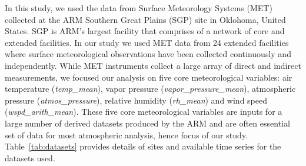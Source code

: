 In this study, we used the data from Surface Meteorology Systems (MET)
collected at the ARM Southern Great Plains (SGP) site in
Oklohoma, United States. SGP is ARM's largest facility that
comprises of a network of core and extended facilities. In our study we
used MET data from 24 extended facilities where surface meteorological
observations have been collected continuously and independently. 
While MET instruments collect a large array of direct and indirect
measurements, we focused our analysis on five core meteorological variables:
air temperature (\textit{temp\_mean}), vapor pressure
(\textit{vapor\_pressure\_mean}),
atmospheric pressure (\textit{atmos\_pressure}), relative humidity
(\textit{rh\_mean}) and wind speed
(\textit{wspd\_arith\_mean}). These five core meteorological variables are
inputs for a large number of derived datasets produced by the ARM and
are often essential set of data for most atmospheric analysis, hence
focus of our study. Table~\ref{tab:datasets} provides details of sites
and available time series for the datasets used.



